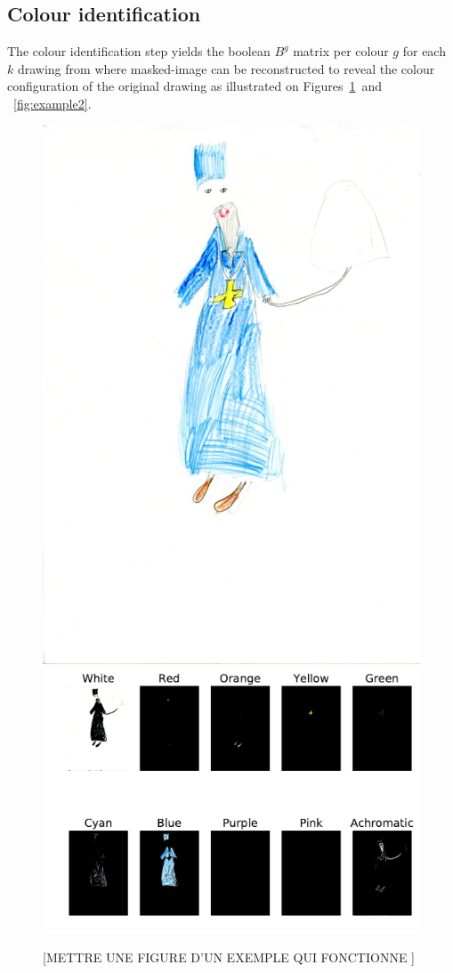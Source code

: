 \documentclass[11pt,a4paper]{article}
\begin{document}
\subsection{Colour identification}

The colour identification step yields the boolean $B^g$ matrix per colour $g$ for each $k$ drawing from where masked-image can be reconstructed to reveal the colour configuration of the original drawing as illustrated on Figures~\ref{fig:example1}~and ~\ref{fig:example2}.

\begin{figure}[!h]
	\centering
	\includegraphics[width=0.32\linewidth]{figures/ru08_bo_f_pb_07_05_don-r}
	\includegraphics[width=0.62\linewidth]{figures/ru08_bo_f_pb_07_05_don-rno_filter_mask.pdf}
	\caption{{[METTRE UNE FIGURE D'UN EXEMPLE QUI FONCTIONNE ]} }
	\label{fig:example1}
\end{figure}
\end{document}

